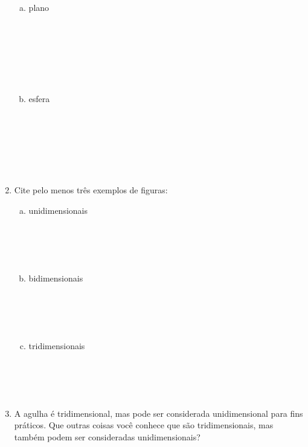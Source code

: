 \documentclass[a4paper,14pt]{article}
\begin{document}
\begin{multicols}{2}
\begin{enumerate}
\begin{enumerate}[a)]
				\item plano \\\\\\\\\\\\\\
				\item esfera \\\\\\\\\\\\\\
			\end{enumerate}	
			\item Cite pelo menos três exemplos de figuras:
			\begin{enumerate}[a)]
				\item unidimensionais \\\\\\\\\\
				\item bidimensionais \\\\\\\\\\
				\item tridimensionais \\\\\\\\\\
			\end{enumerate}
			\item A agulha é tridimensional, mas pode ser considerada unidimensional para fins práticos. Que outras coisas você conhece que são tridimensionais, mas também podem ser consideradas unidimensionais?
		\end{enumerate}
		$~$ \\ $~$ \\ $~$ \\ $~$ \\ $~$ \\ $~$ \\ $~$ \\ $~$ \\ $~$ \\ $~$ \\ 
	\end{multicols}
\end{document}
